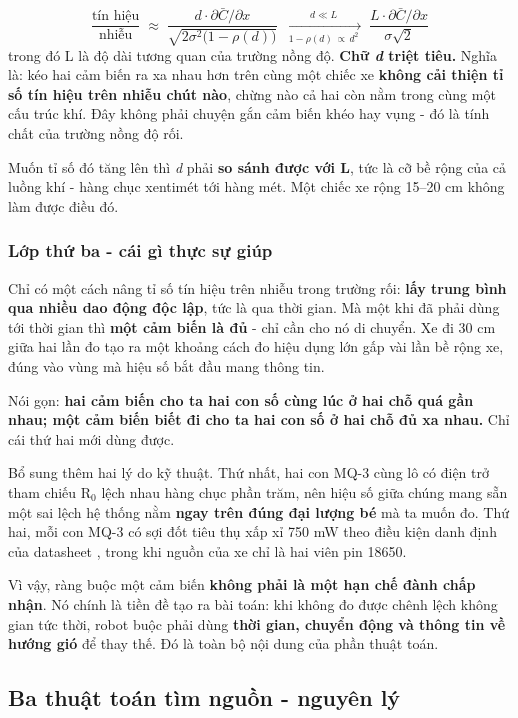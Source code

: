 \[ \frac{\text{tín hiệu}}{\text{nhiễu}} \;\approx\; \frac{d\cdot\partial\bar{C}/\partial x}{\sqrt{2\sigma^{2}\bigl(1-\rho(d)\bigr)}} \;\xrightarrow[\;1-\rho(d)\,\propto\,d^{2}\;]{\;d\ll L\;}\; \frac{L\cdot\partial\bar{C}/\partial x}{\sigma\sqrt{2}} \]
trong đó L là độ dài tương quan của trường nồng độ. \textbf{Chữ \textit{d} triệt tiêu.} Nghĩa là: kéo hai cảm biến ra xa nhau hơn trên cùng một chiếc xe \textbf{không cải thiện tỉ số tín hiệu trên nhiễu chút nào}, chừng nào cả hai còn nằm trong cùng một cấu trúc khí. Đây không phải chuyện gắn cảm biến khéo hay vụng - đó là tính chất của trường nồng độ rối.

Muốn tỉ số đó tăng lên thì \textit{d} phải \textbf{so sánh được với L}, tức là cỡ bề rộng của cả luồng khí - hàng chục xentimét tới hàng mét. Một chiếc xe rộng 15--20 cm không làm được điều đó.


\subsubsection{Lớp thứ ba - cái gì thực sự giúp}
Chỉ có một cách nâng tỉ số tín hiệu trên nhiễu trong trường rối: \textbf{lấy trung bình qua nhiều dao động độc lập}, tức là qua thời gian. Mà một khi đã phải dùng tới thời gian thì \textbf{một cảm biến là đủ} - chỉ cần cho nó di chuyển. Xe đi 30 cm giữa hai lần đo tạo ra một khoảng cách đo hiệu dụng lớn gấp vài lần bề rộng xe, đúng vào vùng mà hiệu số bắt đầu mang thông tin.

Nói gọn: \textbf{hai cảm biến cho ta hai con số cùng lúc ở hai chỗ quá gần nhau; một cảm biến biết đi cho ta hai con số ở hai chỗ đủ xa nhau.} Chỉ cái thứ hai mới dùng được.

Bổ sung thêm hai lý do kỹ thuật. Thứ nhất, hai con MQ-3 cùng lô có điện trở tham chiếu R$_{0}$ lệch nhau hàng chục phần trăm, nên hiệu số giữa chúng mang sẵn một sai lệch hệ thống nằm \textbf{ngay trên đúng đại lượng bé} mà ta muốn đo. Thứ hai, mỗi con MQ-3 có sợi đốt tiêu thụ xấp xỉ 750 mW theo điều kiện danh định của datasheet \cite{r7}, trong khi nguồn của xe chỉ là hai viên pin 18650.

Vì vậy, ràng buộc một cảm biến \textbf{không phải là một hạn chế đành chấp nhận}. Nó chính là tiền đề tạo ra bài toán: khi không đo được chênh lệch không gian tức thời, robot buộc phải dùng \textbf{thời gian, chuyển động và thông tin về hướng gió} để thay thế. Đó là toàn bộ nội dung của phần thuật toán.

\subsection{Ba thuật toán tìm nguồn - nguyên lý}

